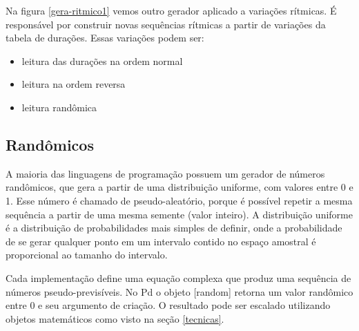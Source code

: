\documentclass{ppgmus}
\begin{document}
Na figura \ref{gera-ritmico1} vemos outro gerador aplicado
a variações rítmicas.
É responsável por construir novas sequências rítmicas a partir de variações
da tabela de durações. Essas variações podem ser:
\begin{itemize}
 \item leitura das durações na ordem normal
 \item leitura na ordem reversa
 \item leitura randômica
\end{itemize}




\subsection{Randômicos}



A maioria das linguagens de programação possuem um 
gerador de números randômicos, que gera a partir de uma distribuição uniforme, com valores entre 0 e 1. 
Esse número é chamado de pseudo-aleatório, porque é possível repetir a mesma sequência a partir de uma 
mesma semente (valor inteiro). A distribuição uniforme é a distribuição de probabilidades  
mais simples de definir, onde a probabilidade de se gerar qualquer ponto em um intervalo contido no 
espaço amostral é proporcional ao tamanho do intervalo.

Cada implementação define uma equação complexa que produz uma sequência de números
pseudo-previsíveis. No Pd o objeto [random] retorna um valor randômico entre 0 e seu argumento
de criação. O resultado pode ser escalado utilizando objetos matemáticos como visto na seção \ref{tecnicas}.
 
\end{document}
